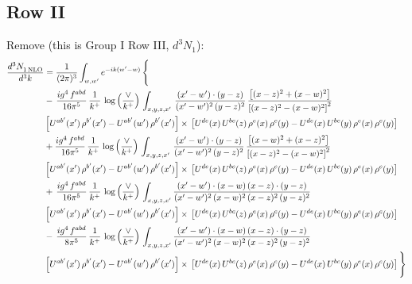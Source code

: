 \documentclass[9pt]{article}
\numberwithin{equation}{section}
\begin{document}
\subsection{Row II}
{\color{red}\noindent Remove (this is Group I Row III, $d^3N_1$):}
{\color{red}\begin{align}
\frac{d^{3}N_{1\,\rm NLO}^{\rm}}{d^{3}k}  & =  \frac{1}{(2\pi)^{3}}  \int_{w, w^\prime} e^{-ik(w^\prime-w)}\, \Bigg\{\notag \\
& -\,\frac{ig^{4}\,f^{abd}}{16\pi^{5}}\,\frac{1}{k^{+}}\,\log{\left(\frac{\vee}{k^{+}}\right)}\,\int_{x,y,z,x'}\, \frac{(x'-w')\cdot (y-z)}{(x'-w')^{2}\,(y-z)^{2}}\,\frac{\left[(x-z)^{2}+(x-w)^{2}\right]}{\left[(x-z)^{2}-(x-w)^{2}\right]^{2}}\notag \\ & \left[U^{ab'}(x')\,\rho^{b'}(x')-U^{ab'}(w')\, \rho^{b'}(x')\right]\times\, \left[U^{de}(x)\,U^{bc}(z)\, \rho^{e}(x)\,\rho^{c}(y)-U^{de}(x)\,U^{bc}(y)\,\rho^{e}(x)\,\rho^{c}(y)\right] \notag \\
&  +\frac{ig^{4}\,f^{abd}}{16\pi^{5}}\, \frac{1}{k^{+}}\,\log{\left(\frac{\vee}{k^{+}}\right)}\,\int_{x,y,z,x'}\, \frac{(x'-w')\cdot (y-z)}{(x'-w')^{2}\,(y-z)^{2}}\, \frac{\left[(x-w)^{2}+(x-z)^{2}\right]}{\left[(x-z)^{2}-(x-w)^{2}\right]^{2}}\notag \\ & \left[U^{ab'}(x')\,\rho^{b'}(x')-U^{ab'}(w')\, \rho^{b'}(x')\right]\times\, \left[U^{de}(x)\,U^{bc}(z)\, \rho^{e}(x)\,\rho^{c}(y)-U^{de}(x)\,U^{bc}(y)\,\rho^{e}(x)\,\rho^{c}(y)\right] \notag \\
& +\, \frac{ig^{4}\,f^{abd}}{16\pi^{5}}\,\frac{1}{k^{+}}\,\log{\left(\frac{\vee}{k^{+}}\right)}\,\int_{x,y,z,x'} \frac{(x'-w')\cdot (x-w)\, (x-z)\cdot (y-z)}{(x'-w')^{2}\, (x-w)^{2}\, (x-z)^{2}\, (y-z)^{2}}\, \notag \\ & \left[U^{ab'}(x')\,\rho^{b'}(x')-U^{ab'}(w')\, \rho^{b'}(x')\right]\times\, \left[U^{de}(x)\,U^{bc}(z)\, \rho^{e}(x)\,\rho^{c}(y)-U^{de}(x)\,U^{bc}(y)\,\rho^{e}(x)\,\rho^{c}(y)\right] \notag \\
&-\, \frac{ig^{4}\,f^{abd}}{8\pi^{5}}\,\frac{1}{k^{+}}\,\log{\left(\frac{\vee}{k^{+}}\right)} \,\int_{x,y,z,x'}\frac{(x'-w')\cdot (x-w)\, (x-z)\cdot (y-z)}{(x'-w')^{2}\, (x-w)^{2}\, (x-z)^{2}\, (y-z)^{2}}\notag \\ & \left[U^{ab'}(x')\,\rho^{b'}(x')-U^{ab'}(w')\, \rho^{b'}(x')\right]\times\, \left[U^{de}(x)\,U^{bc}(z)\, \rho^{e}(x)\,\rho^{c}(y)-U^{de}(x)\,U^{bc}(y)\,\rho^{e}(x)\,\rho^{c}(y)\right]\Bigg\}
\end{align}}
\end{document}
